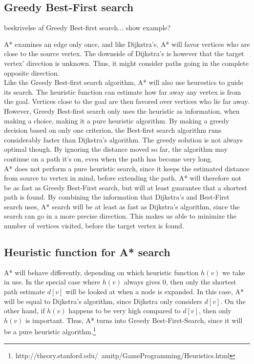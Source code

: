\documentclass[11pt]{article}
\begin{document}
\subsection{Greedy Best-First search}
\noindent beskrivelse af Greedy Best-first search... show example?



\noindent A* examines an edge only once, and like Dijkstra's, A* will favor vertices who are close to the source vertex. The downside of Dijkstra's is however that the target vertex' direction is unknown. Thus, it might consider paths going in the complete opposite direction.\\

\noindent Like the Greedy Best-first search algorithm, A* will also use heurestics to guide its search. The heuristic function can estimate how far away any vertex is from the goal. Vertices close to the goal are then favored over vertices who lie far away. However, Greedy Best-first search only uses the heuristic as information, when making a choice, making it a pure heuristic algorithm. By making a greedy decision based on only one criterion, the Best-first search algorithm runs considerably faster than Dijkstra's algorithm. The greedy solution is not always optimal though. By ignoring the distance moved so far, the algorithm may continue on a path it's on, even when the path has become very long.\\

\noindent A* does not perform a pure heuristic search, since it keeps the estimated distance from source to vertex in mind, before extending the path. A* will therefore not be as fast as Greedy Best-First search, but will at least guarantee that a shortest path is found. By combining the information that Dijkstra's and Best-First search uses, A* search will be at least as fast as Dijkstra's algorithm, since the search can go in a more precise direction. This makes us able to minimize the number of vertices visited, before the target vertex is found. \\

\subsection{Heuristic function for A* search}
A* will behave differently, depending on which heuristic function $h(v)$ we take in use. In the special case where $h(v)$ always gives 0, then only the shortest path estimate $d[v]$ will be looked at when a node is expanded. In this case, A* will be equal to Dijkstra's algorithm, since Dijkstra only considers $d[v]$. On the other hand, if $h(v)$ happens to be very high compared to $d[v]$, then only $h(v)$ is important. Thus, A* turns into Greedy Best-First-Search, since it will be a pure heuristic algorithm.\footnote{http://theory.stanford.edu/~amitp/GameProgramming/Heuristics.html}\\
\end{document}
